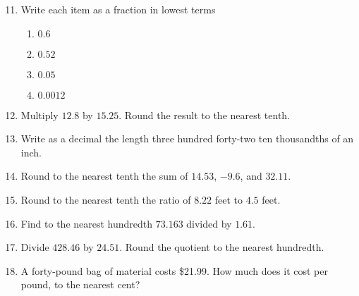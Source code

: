 \documentclass[12pt]{article}
\begin{document}
  \vspace{0.25in}
\begin{enumerate}
\setcounter{enumi}{10}
		\newcommand{\spacing}{\vspace{0.60in}}
\item Write each item as a fraction in lowest terms 
\begin{multicols}{2}
\begin{enumerate}

\item \hspace{0.25in} $0.6$ 
  \vspace{0.25in}
  
\item \hspace{0.25in} $0.52$ 
  \vspace{0.25in}

\item \hspace{0.25in} $0.05$ 
  \vspace{0.25in}

\item \hspace{0.25in} $0.0012$ 
  \vspace{0.25in}

\end{enumerate}
\end{multicols}
  \vspace{0.25in}

\item Multiply $12.8$ by $15.25$. Round the result to the nearest tenth. 
\spacing

\item Write as a decimal the length three hundred forty-two ten thousandths of an inch. 
\spacing

\item Round to the nearest tenth the sum of $14.53$, $-9.6$, and $32.11$. 
\spacing

\item Round to the nearest tenth the ratio of $8.22$ feet to $4.5$ feet.  
\spacing

\item Find to the nearest hundredth $73.163$ divided by $1.61$.  
\spacing

\item Divide $428.46$ by $24.51$. Round the quotient to the nearest hundredth.   
\spacing

\item A forty-pound bag of material costs \$21.99. How much does it cost per pound, to the nearest cent? 
\spacing


\end{enumerate}
\end{document}
